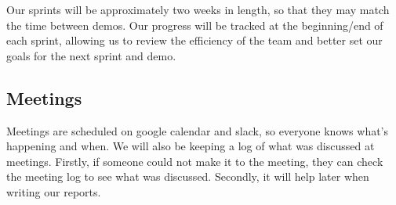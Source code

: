 \documentclass[onecolumn]{IEEEtran}
\begin{document}
Our sprints will be approximately two weeks in length, so that they may match the time between demos. Our progress will be tracked at the beginning/end of each sprint, allowing us to review the efficiency of the team and better set our goals for the next sprint and demo.

\subsection{Meetings}

Meetings are scheduled on google calendar and slack, so everyone knows what's happening and when. We will also be keeping a log of what was discussed at meetings. Firstly, if someone could not make it to the meeting, they can check the meeting log to see what was discussed. Secondly, it will help later when writing our reports.
\end{document}
